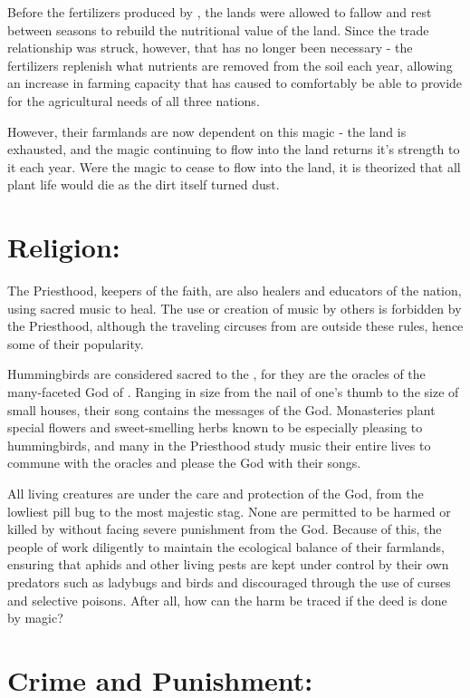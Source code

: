 \documentclass[blue]{GL2020}
\begin{document}
Before the fertilizers produced by \pTech{}, the lands were allowed to fallow and rest between seasons to rebuild the nutritional value of the land.  Since the trade relationship was struck, however, that has no longer been necessary - the fertilizers replenish what nutrients are removed from the soil each year, allowing an increase in farming capacity that has caused \pFarm{} to comfortably be able to provide for the agricultural needs of all three nations.

However, their farmlands are now dependent on this magic - the land is exhausted, and the magic continuing to flow into the land returns it's strength to it each year.  Were the magic to cease to flow into the land, it is theorized that all plant life would die as the dirt itself turned dust.
 
\section*{Religion:}

The Priesthood, keepers of the faith, are also healers and educators of the nation, using sacred music to heal.  The use or creation of music by others is forbidden by the Priesthood, although the traveling circuses from \pTech{} are outside these rules, hence some of their popularity.

Hummingbirds are considered sacred to the \pFarmers{}, for they are the oracles of the many-faceted God of \pFarm{}.  Ranging in size from the nail of one's thumb to the size of small houses, their song contains the messages of the God.  Monasteries plant special flowers and sweet-smelling herbs known to be especially pleasing to hummingbirds, and many in the Priesthood study music their entire lives to commune with the oracles and please the God with their songs.

All living creatures are under the care and protection of the God, from the lowliest pill bug to the most majestic stag.  None are permitted to be harmed or killed by \pFarm{} without facing severe punishment from the God.  Because of this, the people of \pFarm{} work diligently to maintain the ecological balance of their farmlands, ensuring that aphids and other living pests are kept under control by their own predators such as ladybugs and birds and discouraged through the use of curses and selective poisons.  After all, how can the harm be traced if the deed is done by magic?  

\section*{Crime and Punishment:}
\end{document}
